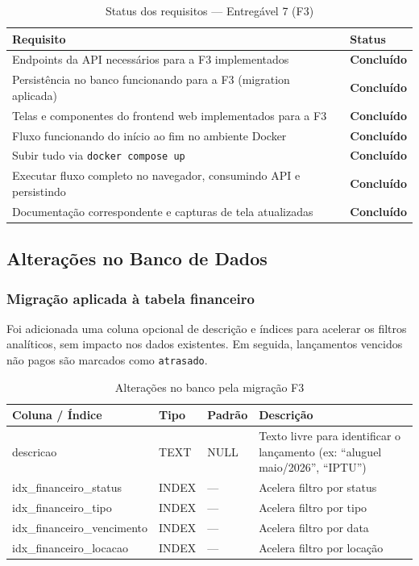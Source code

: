 \documentclass[12pt, a4paper]{article}
\newcommand{\thead}[1]{\cellcolor{tableheader}\color{white}\bfseries #1}
\newcommand{\talt}{\rowcolor{tablerowalt}}
\newcommand{\tok}{\textcolor{successgreen}{\textbf{Concluído}}}
\begin{document}
\begin{table}[H]
\centering
\begin{tabularx}{\textwidth}{|X|l|}
\hline
\thead{Requisito} & \thead{Status} \\
\hline
Endpoints da API necessários para a F3 implementados              & \tok \\
\talt Persistência no banco funcionando para a F3 (migration aplicada)  & \tok \\
Telas e componentes do frontend web implementados para a F3        & \tok \\
\talt Fluxo funcionando do início ao fim no ambiente Docker             & \tok \\
Subir tudo via \texttt{docker compose up}                          & \tok \\
\talt Executar fluxo completo no navegador, consumindo API e persistindo & \tok \\
Documentação correspondente e capturas de tela atualizadas         & \tok \\
\hline
\end{tabularx}
\caption{Status dos requisitos — Entregável 7 (F3)}
\end{table}

\subsection{Alterações no Banco de Dados}

\subsubsection{Migração aplicada à tabela financeiro}

Foi adicionada uma coluna opcional de descrição e índices para acelerar os filtros analíticos, sem impacto nos dados existentes. Em seguida, lançamentos vencidos não pagos são marcados como \texttt{atrasado}.

\begin{table}[H]
\centering
\begin{tabularx}{\textwidth}{|l|l|l|X|}
\hline
\thead{Coluna / Índice} & \thead{Tipo} & \thead{Padrão} & \thead{Descrição} \\
\hline
descricao                       & TEXT     & NULL & Texto livre para identificar o lançamento (ex: ``aluguel maio/2026'', ``IPTU'') \\
\talt idx\_financeiro\_status   & INDEX    & —    & Acelera filtro por status \\
idx\_financeiro\_tipo           & INDEX    & —    & Acelera filtro por tipo \\
\talt idx\_financeiro\_vencimento & INDEX  & —    & Acelera filtro por data \\
idx\_financeiro\_locacao        & INDEX    & —    & Acelera filtro por locação \\
\hline
\end{tabularx}
\caption{Alterações no banco pela migração F3}
\end{table}
\end{document}
